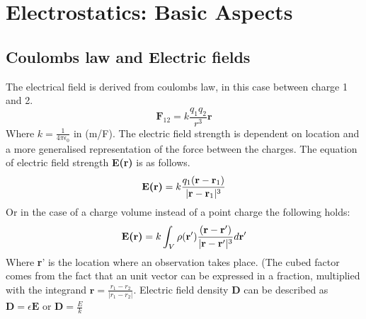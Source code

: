 \chapter{Electrostatics: Basic Aspects}
\section{Coulombs law and Electric fields}
The electrical field is derived from coulombs law, in this case between charge 1 and 2.
\begin{equation}
    \textbf{F}_{12} = k\frac{q_1q_2}{r^3}\textbf{r}
\end{equation}
Where $k = \frac{1}{4\pi \epsilon_0}$ in (m/F). The electric field strength is dependent on location and a more generalised representation of the force between the charges. The equation of electric field strength \textbf{E(\textbf{r})} is as follows.
\begin{equation}
    \textbf{E\textbf{(r)}} = k \frac{q_1(\textbf{r}-\textbf{r}_1)}{|\textbf{r}-\textbf{r}_1|^3}
\end{equation}
Or in the case of a charge volume instead of a point charge the following holds:
\begin{equation}
    \textbf{E(\textbf{r})} = k \int_V \rho(\textbf{r}')\frac{(\textbf{r}-\textbf{r}')}{|\textbf{r}-\textbf{r}'|^3}d\textbf{r}'
\end{equation}
Where \textbf{r}' is the location where an observation takes place. (The cubed factor comes from the fact that an unit vector can be expressed in a fraction, multiplied with the integrand $\textbf{r} = \frac{r_1-r_2}{|r_1-r_2|}$. Electric field density \textbf{D} can be described as $\textbf{D} = \epsilon \textbf{E}$ or $\textbf{D} = \frac{E}{k}$
